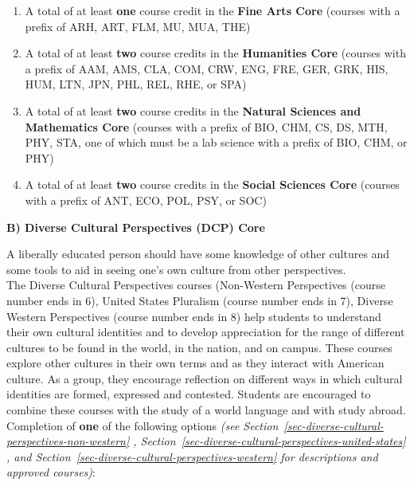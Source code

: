 \documentclass[
  letterpaper,
]{scrbook}
\providecommand{\tightlist}{%
  \setlength{\itemsep}{0pt}\setlength{\parskip}{0pt}}
\begin{document}
\begin{enumerate}
\def\labelenumi{\arabic{enumi}.}
\tightlist
\item
  A total of at least \textbf{one} course credit in the \textbf{Fine
  Arts Core} (courses with a prefix of ARH, ART, FLM, MU, MUA, THE)
\item
  A total of at least \textbf{two} course credits in the
  \textbf{Humanities Core} (courses with a prefix of AAM, AMS, CLA, COM,
  CRW, ENG, FRE, GER, GRK, HIS, HUM, LTN, JPN, PHL, REL, RHE, or SPA)
\item
  A total of at least \textbf{two} course credits in the \textbf{Natural
  Sciences and Mathematics Core} (courses with a prefix of BIO, CHM, CS,
  DS, MTH, PHY, STA, one of which must be a lab science with a prefix of
  BIO, CHM, or PHY)
\item
  A total of at least \textbf{two} course credits in the \textbf{Social
  Sciences Core} (courses with a prefix of ANT, ECO, POL, PSY, or SOC)
\end{enumerate}

\textbf{B) Diverse Cultural Perspectives (DCP) Core}

A liberally educated person should have some knowledge of other cultures
and some tools to aid in seeing one's own culture from other
perspectives.\\
The Diverse Cultural Perspectives courses (Non-Western Perspectives
(course number ends in 6), United States Pluralism (course number ends
in 7), Diverse Western Perspectives (course number ends in 8) help
students to understand their own cultural identities and to develop
appreciation for the range of different cultures to be found in the
world, in the nation, and on campus. These courses explore other
cultures in their own terms and as they interact with American culture.
As a group, they encourage reflection on different ways in which
cultural identities are formed, expressed and contested. Students are
encouraged to combine these courses with the study of a world language
and with study abroad.\\
Completion of \textbf{one} of the following options \emph{(see
Section~\ref{sec-diverse-cultural-perspectives-non-western} ,
Section~\ref{sec-diverse-cultural-perspectives-united-states} , and
Section~\ref{sec-diverse-cultural-perspectives-western} for descriptions
and approved courses)}:
\end{document}
